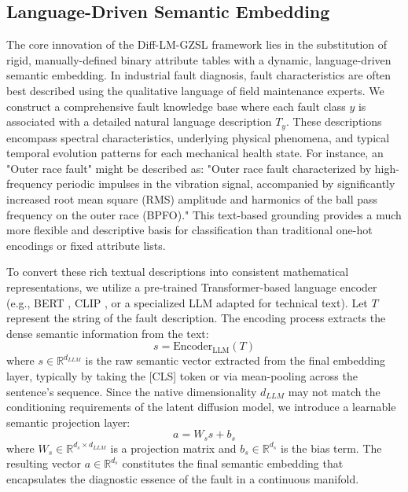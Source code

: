 \documentclass[journal]{IEEEtran}
\begin{document}
\subsection{Language-Driven Semantic Embedding}
\label{sec:semantic}
The core innovation of the Diff-LM-GZSL framework lies in the substitution of rigid, manually-defined binary attribute tables with a dynamic, language-driven semantic embedding. In industrial fault diagnosis, fault characteristics are often best described using the qualitative language of field maintenance experts. We construct a comprehensive fault knowledge base where each fault class $y$ is associated with a detailed natural language description $T_y$. These descriptions encompass spectral characteristics, underlying physical phenomena, and typical temporal evolution patterns for each mechanical health state. For instance, an "Outer race fault" might be described as: "Outer race fault characterized by high-frequency periodic impulses in the vibration signal, accompanied by significantly increased root mean square (RMS) amplitude and harmonics of the ball pass frequency on the outer race (BPFO)." This text-based grounding provides a much more flexible and descriptive basis for classification than traditional one-hot encodings or fixed attribute lists.

To convert these rich textual descriptions into consistent mathematical representations, we utilize a pre-trained Transformer-based language encoder (e.g., BERT \cite{Devlin2019BERT}, CLIP \cite{Radford2021CLIP}, or a specialized LLM adapted for technical text). Let $T$ represent the string of the fault description. The encoding process extracts the dense semantic information from the text:
\begin{equation}
s = \text{Encoder}_{\text{LLM}}(T)
\end{equation}
where $s \in \mathbb{R}^{d_{LLM}}$ is the raw semantic vector extracted from the final embedding layer, typically by taking the [CLS] token or via mean-pooling across the sentence's sequence. Since the native dimensionality $d_{LLM}$ may not match the conditioning requirements of the latent diffusion model, we introduce a learnable semantic projection layer:
\begin{equation}
a = W_s s + b_s
\end{equation}
where $W_s \in \mathbb{R}^{d_s \times d_{LLM}}$ is a projection matrix and $b_s \in \mathbb{R}^{d_s}$ is the bias term. The resulting vector $a \in \mathbb{R}^{d_s}$ constitutes the final semantic embedding that encapsulates the diagnostic essence of the fault in a continuous manifold.
\end{document}
